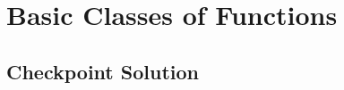 \documentclass[11pt, letterpaper, oneside]{memoir}
\begin{document}
\chapter{Basic Classes of Functions}

\section*{Checkpoint Solution}


\end{document}
